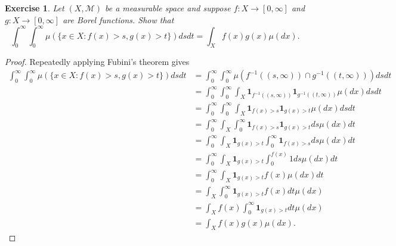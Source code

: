 \documentclass{article}
\newtheorem{exercise}[theorem]{Exercise}
\begin{document}
\begin{exercise}
Let $(X, \mathcal{M})$ be a measurable space and suppose $f : X \to [0,\infty]$ and $g : X \to [0,\infty]$ are Borel functions. Show that
\[
\int_{0}^{\infty} \int_{0}^{\infty} \mu(\{x \in X : f(x) > s, g(x) > t\})dsdt = \int_{X} f(x)g(x)\mu(dx).
\]
\end{exercise}
\begin{proof}
Repeatedly applying Fubini's theorem gives\begin{align*}
\int_{0}^{\infty} \int_{0}^{\infty} \mu(\{x \in X : f(x) > s, g(x) > t\})dsdt&=\int_0^\infty\int_0^\infty\mu(f^{-1}((s,\infty))\cap g^{-1}((t,\infty)))dsdt\\&=\int_0^\infty\int_0^\infty\int_X\mathbf{1}_{f^{-1}((s,\infty))}\mathbf{1}_{g^{-1}((t,\infty))}\mu(dx) dsdt\\&=\int_0^\infty\int_0^\infty\int_X\mathbf{1}_{f(x)>s}\mathbf{1}_{g(x)>t}\mu(dx) dsdt\\&=\int_0^\infty\int_X\int_0^\infty\mathbf{1}_{f(x)>s}\mathbf{1}_{g(x)>t}ds\mu(dx) dt\\&=\int_0^\infty\int_X\mathbf{1}_{g(x)>t}\int_0^\infty\mathbf{1}_{f(x)>s}ds\mu(dx) dt\\&=\int_0^\infty\int_X\mathbf{1}_{g(x)>t}\int_0^{f(x)}1ds\mu(dx) dt\\&=\int_0^\infty\int_X\mathbf{1}_{g(x)>t}f(x)\mu(dx)dt\\&=\int_X\int_0^\infty\mathbf{1}_{g(x)>t}f(x)dt\mu(dx)\\&=\int_Xf(x)\int_0^\infty\mathbf{1}_{g(x)>t}dt\mu(dx)\\&=\int_Xf(x)g(x)\mu(dx).\end{align*}
\end{proof}
\end{document}
